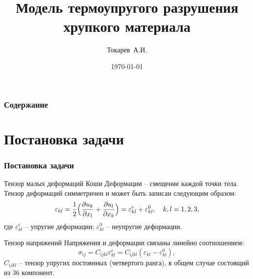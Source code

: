 \documentclass[unicode, 8pt]{beamer}
\title[Курсовая работа]{Модель термоупругого разрушения хрупкого материала}
\author[Токарев~А.И.]{Токарев~А.И.}
\institute[]{МГТУ им. Н.Э. Баумана}
\date{\today}
\begin{document}
    \begin{frame}
        \titlepage
    \end{frame}

    \begin{frame}
        \frametitle{Содержание}
        \tableofcontents
    \end{frame}

    \section{Постановка задачи}

    \begin{frame}
        \frametitle{Постановка задачи}
        \begin{block}{Тензор малых деформаций Коши}
            \fontsize{10.4pt}{12pt}\selectfont
            Деформации -- смещение каждой точки тела. Тензор деформаций симметричен и может быть записан следующим образом:
            \[
                \varepsilon_{kl} = \dfrac{1}{2}\Bigl( \dfrac{\partial u_k}{\partial x_l} + \dfrac{\partial u_l}{\partial x_k} \Bigr) = \varepsilon_{kl}^e +  \varepsilon_{kl}^0, \quad k, l = 1, 2, 3,  
            \]
            \noindent где $\varepsilon_{kl}^e$ -- упругие деформации; $\varepsilon_{kl}^0$ -- неупругие деформации.
        \end{block}

        \begin{block}{Тензор напряжений}
            \fontsize{10.4pt}{12pt}\selectfont
            Напряжения и деформации связаны линейно соотношением:
            \[
                \sigma_{ij} = C_{ijkl} \varepsilon_{kl}^e = C_{ijkl}(\varepsilon_{kl} - \varepsilon_{kl}^0),
            \]
            \noindent $C_{ijkl}$ -- тензор упругих постоянных (четвертого ранга), в общем случае состоящий из $36$ компонент. 
        \end{block}
    \end{frame}
\end{document}
